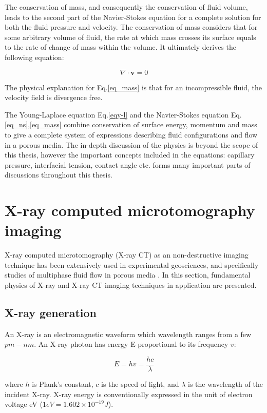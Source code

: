 The conservation of mass, and consequently the conservation of fluid volume, leads to the second part of the Navier-Stokes equation for a complete solution for both the fluid pressure and velocity. The conservation of mass considers that for some arbitrary volume of fluid, the rate at which mass crosses its surface equals to the rate of change of mass within the volume. It ultimately derives the following equation:

\begin{equation}\label{eq_mass}
    \nabla \cdot \mathbf{v} = 0
\end{equation}

The physical explanation for Eq.\ref{eq_mass} is that for an incompressible fluid, the velocity field is divergence free.

The Young-Laplace equation Eq.\ref{eqy-l} and the Navier-Stokes equation Eq.\ref{eq_ns},\ref{eq_mass} combine conservation of surface energy, momentum and mass to give a complete system of expressions describing fluid configurations and flow in a porous media. The in-depth discussion of the physics is beyond the scope of this thesis, however the important concepts included in the equations: capillary pressure, interfacial tension, contact angle etc. forms many important parts of discussions throughout this thesis.


\section{X-ray computed microtomography imaging}
X-ray computed microtomography (X-ray CT) as an non-destructive imaging technique has been extensively used in experimental geosciences, and specifically studies of multiphase fluid flow in porous media \citep{ketcham2001acquisition,akin2003computed,wildenschild2013x}. In this section, fundamental physics of X-ray and X-ray CT imaging techniques in application are presented.

\subsection{X-ray generation}
An X-ray is an electromagnetic waveform which wavelength ranges from a few $pm-nm$. An X-ray photon has energy E proportional to its frequency $v$:

\begin{equation}
    E=hv=\frac{hc}{\lambda}
\end{equation}

where $h$ is Plank's constant, $c$ is the speed of light, and $\lambda$ is the wavelength of the incident X-ray. X-ray energy is conventionally expressed in the unit of electron voltage eV ($1 eV = 1.602 \times 10^{-19}J$).

